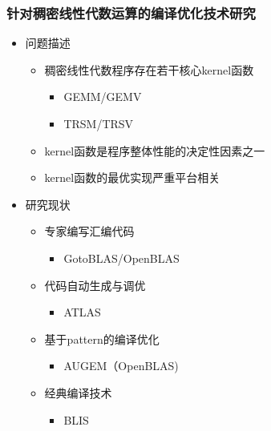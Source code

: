 \documentclass[aspectratio=169]{beamer}
\begin{document}
\begin{frame}
  \frametitle{针对稠密线性代数运算的编译优化技术研究}
  \begin{itemize}
  \item 问题描述
    \begin{itemize}
    \item 稠密线性代数程序存在若干核心kernel函数
      \begin{itemize}
      \item GEMM/GEMV
      \item TRSM/TRSV
      \end{itemize}
    \item kernel函数是程序整体性能的决定性因素之一
    \item kernel函数的最优实现严重平台相关
    \end{itemize}
  \item 研究现状
    \begin{itemize}
    \item 专家编写汇编代码
      \begin{itemize}
      \item GotoBLAS/OpenBLAS
      \end{itemize}
    \item 代码自动生成与调优
      \begin{itemize}
      \item ATLAS
      \end{itemize}
    \item 基于pattern的编译优化
      \begin{itemize}
      \item AUGEM（OpenBLAS)
      \end{itemize}
    \item 经典编译技术
      \begin{itemize}
      \item BLIS
      \end{itemize}
    \end{itemize}
  \end{itemize}
\end{frame}
\end{document}
